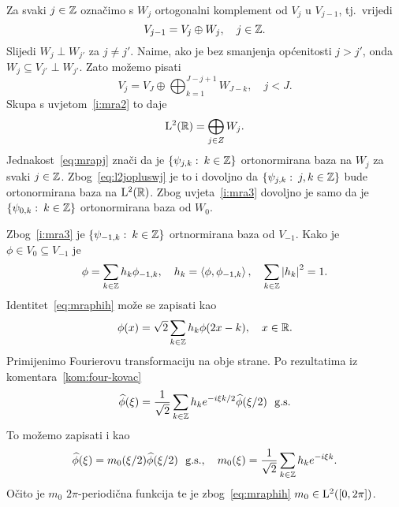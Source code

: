 \documentclass[main.tex]{subfiles}
\begin{document}
Za svaki \( j \in \mathbb{Z} \) označimo s \( W_j \) ortogonalni komplement od \( V_j \)
u \( V_{j-1} \), tj.\ vrijedi
\begin{equation}
	V_{j-1} = V_j \oplus W_j, \quad j \in \mathbb{Z}.
\end{equation}
Slijedi \( W_j \perp W_{j'} \) za \( j \neq j' \). Naime, ako je bez smanjenja općenitosti
\( j > j' \), onda \( W_j \subseteq V_{j'} \perp W_{j'} \). Zato možemo pisati
\begin{equation}
	V_j = V_J \oplus \bigoplus_{k=1}^{J-j+1} W_{J-k}, \quad j < J.
\end{equation}
Skupa s uvjetom~\ref{i:mra2} to daje
\begin{equation}\label{eq:l2jopluswj}
	\mathrm{L}^2(\mathbb{R}) = \bigoplus_{j \in Z} W_j.
\end{equation}
Jednakost~\eqref{eq:mrapj} znači da je
\( \left\{ \psi_{j,k} \, \colon \, k \in \mathbb{Z} \right\} \) ortonormirana baza
na \( W_j \) za svaki \( j \in \mathbb{Z} \). Zbog~\eqref{eq:l2jopluswj}
je to i dovoljno da \( \left\{ \psi_{j,k} \, \colon \, j,k \in \mathbb{Z} \right\} \)
bude ortonormirana baza na \( \mathrm{L}^2(\mathbb{R}) \). Zbog uvjeta~\ref{i:mra3}
dovoljno je samo da je \( \left\{ \psi_{0,k} \, \colon \, k \in \mathbb{Z} \right\} \)
ortonormirana baza od \( W_0 \).

Zbog~\ref{i:mra3} je \( \left\{ \psi_{-1, k} \, \colon \, k \in \mathbb{Z} \right\} \)
ortnormirana baza od \( V_{-1} \). Kako je \( \phi \in V_0 \subseteq V_{-1} \)
je
\begin{equation}\label{eq:mraphih}
	\phi = \sum_{k \in \mathbb{Z}} h_k \phi_{-1,k}, \quad h_k = \left\langle {\phi}, {\phi_{-1,k}} \right\rangle,
	\quad \sum_{k \in \mathbb{Z}} \left| {h_k} \right|^2 = 1.
\end{equation}
Identitet~\eqref{eq:mraphih} može se zapisati kao
\begin{equation}
	\phi(x) = \sqrt 2 \sum_{k \in \mathbb{Z}} h_k \phi(2x-k), \quad x \in \mathbb{R}.
\end{equation}
Primijenimo Fourierovu transformaciju na obje strane. Po rezultatima iz komentara~\ref{kom:four-kovac}
\newcommand{\mathgs}{\ \ \mathrm{g.s.}}
\begin{equation}
	\wh \phi(\xi) = \frac 1{\sqrt 2} \sum_{k \in \Z}
	h_k e^{-i\xi k/2} \wh \phi(\xi/2) \mathgs
\end{equation}
To možemo zapisati i kao
\begin{equation}\label{eq:mraphim0}
	\wh \phi(\xi) = m_0(\xi/2)\wh \phi(\xi/2) \mathgs, \quad
	m_0(\xi) = \frac 1{\sqrt 2} \sum_{k \in \Z} h_k e^{-i\xi k}.
\end{equation}
Očito je \( m_0 \) \( 2\pi \)-periodična funkcija te je
zbog~\eqref{eq:mraphih} \( m_0 \in \mathrm{L}^2([0,2\pi]) \).
\end{document}
